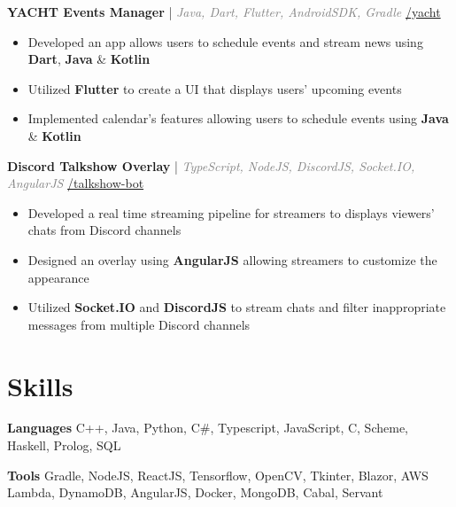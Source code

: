\documentclass[11pt]{article}
\begin{document}
\hspace{10pt}\textbf{YACHT Events Manager} {\small | \textit{\textcolor{gray}{Java, Dart, Flutter, AndroidSDK, Gradle}}} \hfill {\small \href{https://github.com/huynd2001/yacht}{\faGithub{}/yacht}}
  \begin{itemize}[leftmargin=31pt]
  \vspace{-10pt}
    \setlength\itemsep{-5pt}
      \item {\small Developed an app allows users to schedule events and stream news using \textbf{Dart}, \textbf{Java} \& \textbf{Kotlin}}
      \item {\small Utilized \textbf{Flutter} to create a UI that displays users' upcoming events}
      \item {\small Implemented calendar's features allowing users to schedule events using \textbf{Java} \& \textbf{Kotlin}}
      \vspace{-5pt}
  \end{itemize}
 
  \hspace{10pt}\textbf{Discord Talkshow Overlay} {\small | \textit{\textcolor{gray}{TypeScript, NodeJS, DiscordJS, Socket.IO, AngularJS}}} \hfill {\small \href{https://github.com/huynd2001/talkshow-bot}{\faGithub{}/talkshow-bot}}
  \begin{itemize}[leftmargin=31pt]
  \vspace{-10pt}
    \setlength\itemsep{-5pt}
      \item {\small Developed a real time streaming pipeline for streamers to displays viewers' chats from Discord channels}
      \item {\small Designed an overlay using \textbf{AngularJS} allowing streamers to customize the appearance}
      \item {\small Utilized \textbf{Socket.IO} and \textbf{DiscordJS} to stream chats and filter inappropriate messages from multiple Discord channels}
      \vspace{-5pt}
  \end{itemize}

\section{Skills}
    \hspace{10pt}\textbf{Languages} {\small C++, Java, Python, C\#, Typescript, JavaScript, C, Scheme, Haskell, Prolog, SQL}

    \hspace{10pt}\textbf{Tools} {\small Gradle, NodeJS, ReactJS, Tensorflow, OpenCV, Tkinter, Blazor, AWS Lambda, DynamoDB, AngularJS, Docker, MongoDB, Cabal, Servant}
\end{document}
